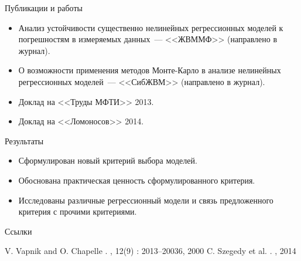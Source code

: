 \documentclass{beamer}
\begin{document}
\begin{frame}{Публикации и работы}
  \begin{itemize}
    \item Анализ устойчивости существенно нелинейных регрессионных моделей к погрешностям в измеряемых данных~--- <<ЖВММФ>> (направлено в журнал).
    \item О возможности применения методов Монте-Карло в анализе нелинейных регрессионных моделей~--- <<СибЖВМ>> (направлено в журнал).
    \item Доклад на <<Труды МФТИ>> 2013.
    \item Доклад на <<Ломоносов>> 2014.
  \end{itemize}
\end{frame}

\begin{frame}{Результаты}
  \begin{itemize}
    \item Сформулирован новый критерий выбора моделей.
    \item Обоснована практическая ценность сформулированного критерия.
    \item Исследованы различные регрессионный модели и связь предложенного критерия с прочими критериями.
  \end{itemize}
\end{frame}

\begin{frame}[allowframebreaks]{Ссылки}
  \begin{thebibliography}{10}    
  \beamertemplatearticlebibitems
    V. Vapnik and O. Chapelle
    .
    , 12(9) : 2013--20036, 2000
    C. Szegedy et al.
    .
    , 2014
  \end{thebibliography}
\end{frame}
\end{document}

